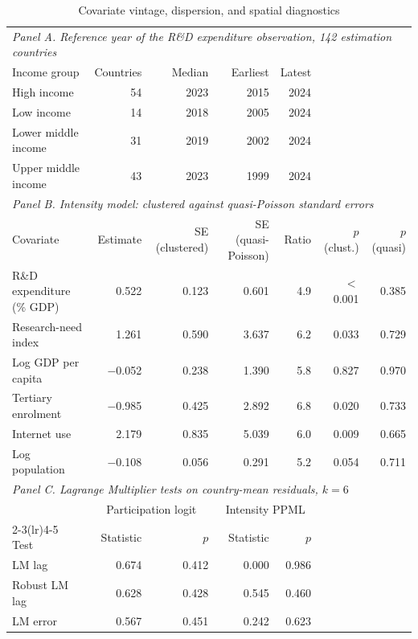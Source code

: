 \begin{table}[!t]
\centering
\footnotesize
\caption{Covariate vintage, dispersion, and spatial diagnostics}
\label{tab:diagnostics}
\begin{tabular*}{\textwidth}{@{\extracolsep\fill}l r r r r r r@{}}
\toprule
\multicolumn{7}{l}{\textit{Panel A. Reference year of the R\&D expenditure observation, 142 estimation countries}} \\
Income group & Countries & Median & Earliest & Latest & \multicolumn{2}{c}{} \\
\midrule
High income & 54 & 2023 & 2015 & 2024 & \multicolumn{2}{c}{} \\
Low income & 14 & 2018 & 2005 & 2024 & \multicolumn{2}{c}{} \\
Lower middle income & 31 & 2019 & 2002 & 2024 & \multicolumn{2}{c}{} \\
Upper middle income & 43 & 2023 & 1999 & 2024 & \multicolumn{2}{c}{} \\
\midrule
\multicolumn{7}{l}{\textit{Panel B. Intensity model: clustered against quasi-Poisson standard errors}} \\
Covariate & Estimate & SE (clustered) & SE (quasi-Poisson) & Ratio & $p$ (clust.) & $p$ (quasi) \\
\midrule
R\&D expenditure (\% GDP) & 0.522 & 0.123 & 0.601 & 4.9 & $<$0.001 & 0.385 \\
Research-need index & 1.261 & 0.590 & 3.637 & 6.2 & 0.033 & 0.729 \\
Log GDP per capita & $-$0.052 & 0.238 & 1.390 & 5.8 & 0.827 & 0.970 \\
Tertiary enrolment & $-$0.985 & 0.425 & 2.892 & 6.8 & 0.020 & 0.733 \\
Internet use & 2.179 & 0.835 & 5.039 & 6.0 & 0.009 & 0.665 \\
Log population & $-$0.108 & 0.056 & 0.291 & 5.2 & 0.054 & 0.711 \\
\midrule
\multicolumn{7}{l}{\textit{Panel C. Lagrange Multiplier tests on country-mean residuals, $k = 6$}} \\
& \multicolumn{2}{c}{Participation logit} & \multicolumn{2}{c}{Intensity PPML} & \multicolumn{2}{c}{} \\
\cmidrule(lr){2-3}\cmidrule(lr){4-5}
Test & Statistic & $p$ & Statistic & $p$ & \multicolumn{2}{c}{} \\
\midrule
LM lag & 0.674 & 0.412 & 0.000 & 0.986 & \\
Robust LM lag & 0.628 & 0.428 & 0.545 & 0.460 & \\
LM error & 0.567 & 0.451 & 0.242 & 0.623 & \\

\end{tabular*}
\end{table}
